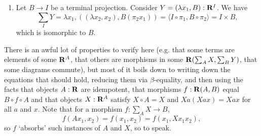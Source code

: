 \begin{enumerate}
  \item Let $ B \to I $ be a terminal projection. Consider $ Y = (\lambda x_1, B) : \mathbf{R}^I $. We have
    \[ \sum_I Y = \lambda x_1, ((\lambda x_2, x_2), B (\pi_2 x_1)) = \langle I \circ \pi_1, B \circ \pi_2 \rangle = I \times B, \]
    which is isomorphic to $ B $.
\end{enumerate}

\begin{remark}
  There is an awful lot of properties to verify here (e.g. that some terms are elements of some $ \mathbf{R}^A $, that others are morphisms in some $ \mathbf{R}(\sum_A X, \sum_B Y) $, that some diagrams commute), but most of it boils down to writing down the equations that should hold, reducing them via $ \beta $-equality, and then using the facts that objects $ A: \mathbf{R} $ are idempotent, that morphisms $ f: \mathbf{R}(A, B) $ equal $ B \circ f \circ A $ and that objects $ X: \mathbf{R}^A $ satisfy $ X \circ A = X $ and $ X a (X a x) = X a x $ for all $ a $ and $ x $. Note that for a morphism $ f: \sum_A X \to B $,
  \[ f(A x_1, x_2) = f(x_1, x_2) = f(x_1, X x_1 x_2), \]
  so $ f $ `absorbs' such instances of $ A $ and $ X $, so to speak.
\end{remark}

